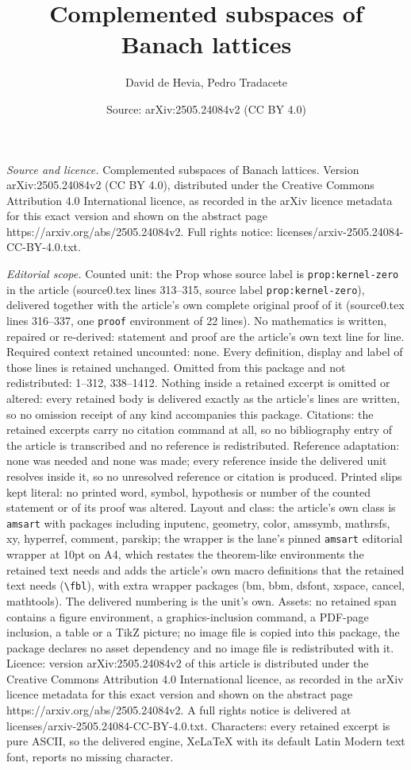 \documentclass[10pt,a4paper]{amsart}
\title[Complemented subspaces of Banach lattices]{Complemented subspaces of Banach lattices}
\author{David de Hevia, Pedro Tradacete}
\date{Source: arXiv:2505.24084v2 (CC BY 4.0)}
\begin{document}
\maketitle

\noindent\emph{Source and licence.} Complemented subspaces of Banach lattices. Version arXiv:2505.24084v2 (CC BY 4.0), distributed under the Creative Commons Attribution 4.0 International licence, as recorded in the arXiv licence metadata for this exact version and shown on the abstract page https://arxiv.org/abs/2505.24084v2. Full rights notice: licenses/arxiv-2505.24084-CC-BY-4.0.txt.\par\smallskip

\noindent\textit{Editorial scope.} Counted unit: the Prop whose source label is \texttt{prop:kernel-zero} in the article (source0.tex lines 313--315, source label \texttt{prop:kernel-zero}), delivered together with the article's own complete original proof of it (source0.tex lines 316--337, one \texttt{proof} environment of 22 lines). No mathematics is written, repaired or re-derived: statement and proof are the article's own text line for line. Required context retained uncounted: none. Every definition, display and label of those lines is retained unchanged. Omitted from this package and not redistributed: 1--312, 338--1412. Nothing inside a retained excerpt is omitted or altered: every retained body is delivered exactly as the article's lines are written, so no omission receipt of any kind accompanies this package. Citations: the retained excerpts carry no citation command at all, so no bibliography entry of the article is transcribed and no reference is redistributed. Reference adaptation: none was needed and none was made; every reference inside the delivered unit resolves inside it, so no unresolved reference or citation is produced. Printed slips kept literal: no printed word, symbol, hypothesis or number of the counted statement or of its proof was altered. Layout and class: the article's own class is \texttt{amsart} with packages including inputenc, geometry, color, amssymb, mathrsfs, xy, hyperref, comment, parskip; the wrapper is the lane's pinned \texttt{amsart} editorial wrapper at 10pt on A4, which restates the theorem-like environments the retained text needs and adds the article's own macro definitions that the retained text needs (\texttt{\textbackslash fbl}), with extra wrapper packages (bm, bbm, dsfont, xspace, cancel, mathtools). The delivered numbering is the unit's own. Assets: no retained span contains a figure environment, a graphics-inclusion command, a PDF-page inclusion, a table or a TikZ picture; no image file is copied into this package, the package declares no asset dependency and no image file is redistributed with it. Licence: version arXiv:2505.24084v2 of this article is distributed under the Creative Commons Attribution 4.0 International licence, as recorded in the arXiv licence metadata for this exact version and shown on the abstract page https://arxiv.org/abs/2505.24084v2. A full rights notice is delivered at licenses/arxiv-2505.24084-CC-BY-4.0.txt. Characters: every retained excerpt is pure ASCII, so the delivered engine, XeLaTeX with its default Latin Modern text font, reports no missing character.
\end{document}

